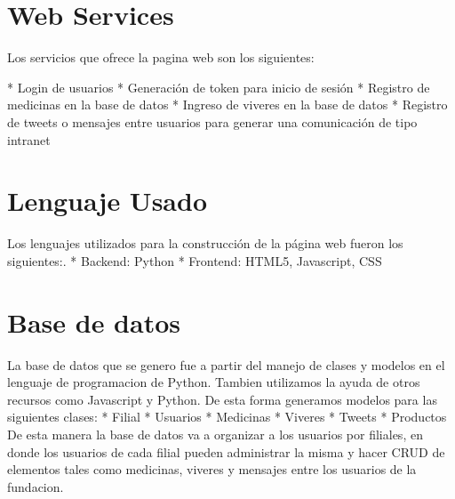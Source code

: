 \documentclass[12pt]{report}
\begin{document}
\section*{Web Services}
\begin{flushleft}
Los servicios que ofrece la pagina web son los siguientes:
\newline
\newline

* Login de usuarios
\newline
* Generación de token para inicio de sesión
\newline
* Registro de medicinas en la base de datos
\newline
* Ingreso de viveres en la base de datos
\newline
* Registro de tweets o mensajes entre usuarios para generar una comunicación de tipo intranet
\newline
\newline
\end{flushleft}

\section*{Lenguaje Usado}
\begin{flushleft}
Los lenguajes utilizados para la construcción de la página web fueron los siguientes:.
\newline
* Backend: Python
\newline
* Frontend: HTML5, Javascript, CSS
\newline
\newline
\end{flushleft}

\section*{Base de datos}
\begin{flushleft}
La base de datos que se genero fue a partir del manejo de clases y modelos en el lenguaje de programacion de Python. Tambien utilizamos la ayuda de otros recursos como Javascript y Python.
De esta forma generamos modelos para las siguientes clases:
\newline
\newline
* Filial
\newline
* Usuarios
\newline
* Medicinas
\newline
* Viveres
\newline
* Tweets
\newline
* Productos
\newline
\newline
De esta manera la base de datos va a organizar a los usuarios por filiales, en donde los usuarios de cada filial pueden administrar la misma y hacer CRUD de elementos tales como medicinas, viveres y mensajes entre los usuarios de la fundacion.
\end{flushleft}
\end{document}

